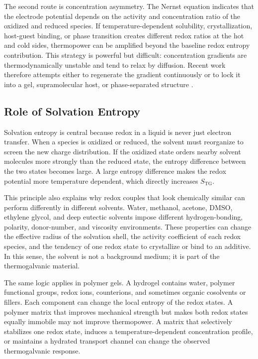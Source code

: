 The second route is concentration asymmetry. The Nernst equation indicates that
the electrode potential depends on the activity and concentration ratio of the
oxidized and reduced species. If temperature-dependent solubility,
crystallization, host-guest binding, or phase transition creates different
redox ratios at the hot and cold sides, thermopower can be amplified beyond the
baseline redox entropy contribution. This strategy is powerful but difficult:
concentration gradients are thermodynamically unstable and tend to relax by
diffusion. Recent work therefore attempts either to regenerate the gradient
continuously or to lock it into a gel, supramolecular host, or phase-separated
structure \citep{zhou2016supramolecular,yu2020thermosensitive,
guo2020nanoparticle}.

\subsection{Role of Solvation Entropy}

Solvation entropy is central because redox in a liquid is never just electron
transfer. When a species is oxidized or reduced, the solvent must reorganize to
screen the new charge distribution. If the oxidized state orders nearby solvent
molecules more strongly than the reduced state, the entropy difference between
the two states becomes large. A large entropy difference makes the redox
potential more temperature dependent, which directly increases
$S_{\mathrm{TG}}$.

This principle also explains why redox couples that look chemically similar can
perform differently in different solvents. Water, methanol, acetone, DMSO,
ethylene glycol, and deep eutectic solvents impose different hydrogen-bonding,
polarity, donor-number, and viscosity environments. These properties can change
the effective radius of the solvation shell, the activity coefficient of each
redox species, and the tendency of one redox state to crystallize or bind to an
additive. In this sense, the solvent is not a background medium; it is part of
the thermogalvanic material.

The same logic applies in polymer gels. A hydrogel contains water, polymer
functional groups, redox ions, counterions, and sometimes organic cosolvents or
fillers. Each component can change the local entropy of the redox states. A
polymer matrix that improves mechanical strength but makes both redox states
equally immobile may not improve thermopower. A matrix that selectively
stabilizes one redox state, induces a temperature-dependent concentration
profile, or maintains a hydrated transport channel can change the observed
thermogalvanic response.


